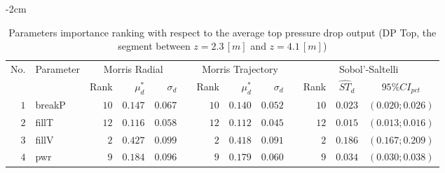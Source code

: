 \begin{table*}[!htbp]\centering
{}
\begin{adjustwidth*}{}{-2cm}
\caption{Parameters importance ranking with respect to the average top pressure drop output (DP Top, the segment between $z = 2.3 \, [m]$ and $z = 4.1 \, [m]$)}
\label{tab:app_screening_dptop_average}
\begin{tabular}{@{}rlrrrrrrrrrcc@{}}\toprule
\multirow{2}{*}{\footnotesize{No.}} & \multirow{2}{*}{\footnotesize{Parameter}} & \multicolumn{3}{c}{\footnotesize{Morris Radial}} & \phantom{a} & \multicolumn{3}{c}{\footnotesize{Morris Trajectory}}  &\phantom{a}& \multicolumn{3}{c}{\footnotesize{Sobol'-Saltelli}}                               \\             
                                                                                  \cmidrule{3-5}                                                   \cmidrule{7-9}                                                      \cmidrule{11-13}
                                    &                                           & \footnotesize{Rank}   & $\mu^*_d$ & $\sigma_d$   &             & \footnotesize{Rank} & $\mu^*_d$ & $\sigma_d$          &           & \footnotesize{Rank} & \footnotesize{$\hat{ST}_d$} & \footnotesize{$95\%CI_{pct}$}\\ \midrule
\footnotesize{$1 $} & \footnotesize{breakP   } & \footnotesize{$10$} & \footnotesize{$0.147$} & \footnotesize{$0.067$} && \footnotesize{$10$} & \footnotesize{$0.140$} & \footnotesize{$0.052$} && \footnotesize{$10$} & \footnotesize{$0.023$} & \footnotesize{$(0.020;0.026)$} \\
\footnotesize{$2 $} & \footnotesize{fillT    } & \footnotesize{$12$} & \footnotesize{$0.116$} & \footnotesize{$0.058$} && \footnotesize{$12$} & \footnotesize{$0.112$} & \footnotesize{$0.045$} && \footnotesize{$12$} & \footnotesize{$0.015$} & \footnotesize{$(0.013;0.016)$} \\
\footnotesize{$3 $} & \footnotesize{fillV    } & \footnotesize{$2 $} & \footnotesize{$0.427$} & \footnotesize{$0.099$} && \footnotesize{$2 $} & \footnotesize{$0.418$} & \footnotesize{$0.091$} && \footnotesize{$2 $} & \footnotesize{$0.186$} & \footnotesize{$(0.167;0.209)$} \\
\footnotesize{$4 $} & \footnotesize{pwr      } & \footnotesize{$9 $} & \footnotesize{$0.184$} & \footnotesize{$0.096$} && \footnotesize{$9 $} & \footnotesize{$0.179$} & \footnotesize{$0.060$} && \footnotesize{$9 $} & \footnotesize{$0.034$} & \footnotesize{$(0.030;0.038)$} \\

\end{tabular}
\end{adjustwidth*}
\end{table*}
